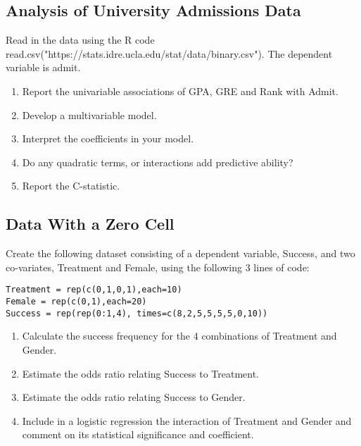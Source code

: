 \documentclass[11pt]{article}
\begin{document}
\subsection{Analysis of University Admissions Data}

Read in the data using the R code read.csv("https://stats.idre.ucla.edu/stat/data/binary.csv"). The dependent variable is admit.
\begin{enumerate}

\item Report the univariable associations of GPA, GRE and Rank with Admit.
\item Develop a multivariable model.
\item Interpret the coefficients in your model.
\item Do any quadratic terms, or interactions add predictive ability?
\item Report the C-statistic.

\end{enumerate}

\subsection{Data With a Zero Cell}

Create the following dataset consisting of a dependent variable, Success, and two co-variates, Treatment and Female, using the following 3 lines of code:

\vspace{3mm}
\begin{spacing}{.25}
\begin{lstlisting}
Treatment = rep(c(0,1,0,1),each=10)
Female = rep(c(0,1),each=20)
Success = rep(rep(0:1,4), times=c(8,2,5,5,5,5,0,10))
\end{lstlisting}
\end{spacing}

\vspace{5mm}

\begin{enumerate}
\item Calculate the success frequency for the 4 combinations of Treatment and Gender. 
\item Estimate the odds ratio relating Success to Treatment.
\item Estimate the odds ratio relating Success to Gender. 
\item Include in a logistic regression the interaction of Treatment and Gender and comment on its statistical significance and coefficient.
\end{enumerate}
\end{document}

